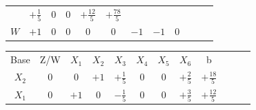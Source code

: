 \documentclass{beamer}
\begin{document}
\begin{frame}
{\begin{table}
\begin{tabular}{c c c c c c c c c c c c}
				& \cellcolor{yellow!50} $\scriptstyle +\frac{1}{5}$
				& \cellcolor{yellow!50} $\scriptstyle 0$
				& \cellcolor{yellow!50} $\scriptstyle 0$
				& \cellcolor{yellow!50} $\scriptstyle +\frac{12}{5}$ 
				& \cellcolor{yellow!50} $\scriptstyle +\frac{78}{5}$  \\
				\cellcolor{blue!100} \color{white} $\scriptstyle W$
				& \cellcolor{yellow!90} $\scriptstyle +1$
				& \cellcolor{yellow!90} $\scriptstyle 0$
				& \cellcolor{yellow!90} $\scriptstyle 0$
				& \cellcolor{yellow!90} $\scriptstyle 0$
				& \cellcolor{yellow!90} $\scriptstyle 0$
				& \cellcolor{yellow!90} $\scriptstyle -1$
				& \cellcolor{yellow!90} $\scriptstyle -1$ 
				& \cellcolor{yellow!90} $\scriptstyle 0$  \\
			\end{tabular}
		\end{table}			
	}		
	{
		\begin{table}		
			\begin{tabular}{c c c c c c c c c c c c}
				\cline{1-8} 
				\cellcolor{blue!100} \color{white} \scriptsize Base 
				&\cellcolor{blue!100} \color{white} \scriptsize Z/W
				&\cellcolor{blue!100} \color{red} $\scriptstyle X_1$ 
				&\cellcolor{blue!100} \color{red} $\scriptstyle X_2$ 
				&\cellcolor{blue!100} \color{white}   $\scriptstyle X_3$ 
				&\cellcolor{blue!100} \color{red} $\scriptstyle X_4$ 
				&\cellcolor{olive!90} \color{white}   $\scriptstyle X_5$ 
				&\cellcolor{olive!90} \color{white}   $\scriptstyle X_6$ 
				&\cellcolor{blue!100} \color{white} \scriptsize b
				&
				&
				& \\
				\cellcolor{blue!100} \color{red} $\scriptstyle X_2$
				& \cellcolor{yellow!50} $\scriptstyle 0$
				& \cellcolor{yellow!50} $\scriptstyle 0$
				& \cellcolor{yellow!50} $\scriptstyle +1$
				& \cellcolor{yellow!50} $\scriptstyle +\frac{1}{5}$
				& \cellcolor{yellow!50} $\scriptstyle 0$
				& \cellcolor{olive!90} $\scriptstyle 0$
				& \cellcolor{olive!90} $\scriptstyle +\frac{2}{5}$
				& \cellcolor{yellow!50} $\scriptstyle +\frac{18}{5}$ \\
			    \cellcolor{blue!100} \color{red} $\scriptstyle X_1$
				& \cellcolor{yellow!50} $\scriptstyle 0$
				& \cellcolor{yellow!50} $\scriptstyle +1$
				& \cellcolor{yellow!50} $\scriptstyle 0$
				& \cellcolor{yellow!50} $\scriptstyle -\frac{1}{5}$			
				& \cellcolor{yellow!50} $\scriptstyle 0$
				& \cellcolor{olive!90} $\scriptstyle 0$
				& \cellcolor{olive!90} $\scriptstyle +\frac{3}{5}$ 
				& \cellcolor{yellow!50} $\scriptstyle +\frac{12}{5}$ \\

\end{tabular}
\end{table}}
\end{frame}
\end{document}

